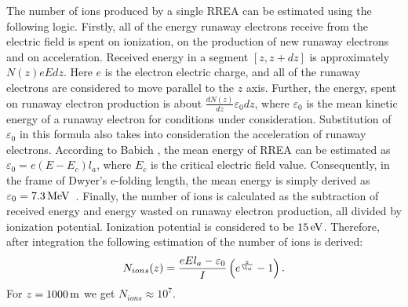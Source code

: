 \documentclass[doublecol,linenumbers]{epl2} %
\begin{document}
The number of ions produced by a single RREA can be estimated using the following logic. Firstly, all of the energy runaway electrons receive from the electric field is spent on ionization, on the production of new runaway electrons and on acceleration. Received energy in a segment $[z, z + dz]$ is approximately $N(z) e E d z$. Here $e$ is the electron electric charge, and all of the runaway electrons are considered to move parallel to the $z$ axis. Further, the energy, spent on runaway electron production is about $\frac{d N(z)}{d z} \varepsilon_{0} d z$, where $\varepsilon_{0}$ is the mean kinetic energy of a runaway electron for conditions under consideration. Substitution of $\varepsilon_0$ in this formula also takes into consideration the acceleration of runaway electrons. According to Babich \cite{Babich2001}, the mean  energy of RREA can be estimated as $\varepsilon_0 = e(E - E_c) l_a$, where $E_c$ is the critical electric field value. Consequently, in the frame of Dwyer's e-folding length, the mean energy is simply derived as $\varepsilon_0 = 7.3\un{MeV}$~\cite{Dwyer2007}. Finally, the number of ions is calculated as the subtraction of received energy and energy wasted on runaway electron production, all divided by ionization potential. Ionization potential is considered to be $15\un{eV}$. Therefore, after integration the following estimation of the number of ions is derived:
\begin{equation}
    N_{ions}(z) = \frac{e E l_a - \varepsilon_0}{I} \left( e^{\frac{z}{\l_a}} - 1\right).
\end{equation}
For $z = 1000\un{m}$ we get $N_{ions} \approx 10^7$.
\end{document}
